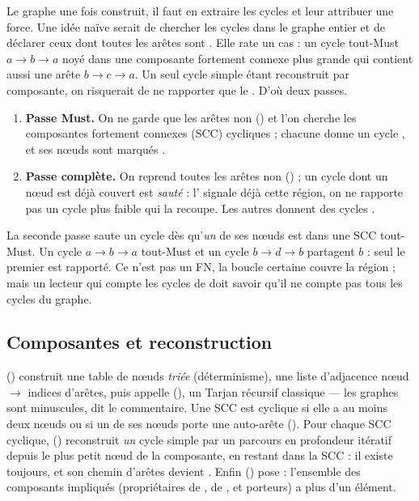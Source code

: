Le graphe une fois construit, il faut en extraire les cycles et leur attribuer une force.
Une idée naïve serait de chercher les cycles dans le graphe entier et de déclarer
 ceux dont toutes les arêtes sont . Elle rate un cas : un cycle
tout-Must $a \to b \to a$ noyé dans une composante fortement connexe plus grande qui
contient aussi une arête  $b \to c \to a$. Un seul cycle simple étant reconstruit
par composante, on risquerait de ne rapporter que le . D'où deux passes.


\begin{enumerate}
  \item \textbf{Passe Must.} On ne garde que les arêtes  non 
        () et l'on cherche les composantes fortement connexes (SCC)
        cycliques ; chacune donne un cycle , et ses nœuds sont
        marqués .
  \item \textbf{Passe complète.} On reprend toutes les arêtes non 
        () ; un cycle dont un nœud est déjà couvert est \emph{sauté} : l'\Error{}
        signale déjà cette région, on ne rapporte pas un cycle plus faible qui la recoupe. Les
        autres donnent des cycles .
\end{enumerate}

\begin{piege}
La seconde passe saute un cycle  dès qu'\emph{un} de ses nœuds est dans une SCC
tout-Must. Un cycle $a \to b \to a$ tout-Must et un cycle $b \to d \to b$ 
partagent $b$ : seul le premier est rapporté. Ce n'est pas un FN, la boucle certaine
couvre la région ; mais un lecteur qui compte les cycles de  doit savoir
qu'il ne compte pas tous les cycles du graphe.
\end{piege}

\subsection{Composantes et reconstruction}

 () construit une table de nœuds
\emph{triée} (déterminisme), une liste d'adjacence nœud $\to$ indices d'arêtes, puis
appelle  (), un Tarjan récursif
classique — \og les graphes sont minuscules\fg, dit le commentaire. Une SCC est cyclique
si elle a au moins deux nœuds ou si un de ses nœuds porte une auto-arête
(). Pour chaque SCC cyclique, 
() reconstruit \emph{un} cycle simple par un parcours en
profondeur itératif depuis le plus petit nœud de la composante, en restant dans la SCC : il
existe toujours, et son chemin d'arêtes devient . Enfin 
() pose  : l'ensemble des
composants impliqués (propriétaires de , de , et porteurs) a plus d'un
élément.

